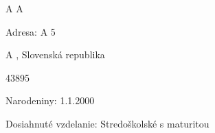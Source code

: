 \documentclass[12pt]{article}
\begin{document}
\renewcommand*{\cvheadingfont}{\huge\bfseries}
\renewcommand*{\cvlistheadingfont}{\large\bfseries}
\setlength{\cvlabelwidth}{41mm}

	\begin{cv}{ A A}
		\begin{cvlist}{}
			\item[\hspace{3mm}Adresa:] A 5
			\item[]A , Slovenská republika
			\item[] 43895
			\item[\hspace{3mm}Narodeniny:] 1.1.2000
		\end{cvlist}

		\begin{cvlist}
		{
		}
			\item[\hspace{3mm}Dosiahnuté vzdelanie:]Stredoškolské s maturitou
		\end{cvlist}
	\end{cv}
\end{document}
